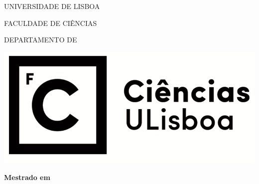 \thispagestyle{empty}


{\coverfont

\begin{center}

{\large 
UNIVERSIDADE DE LISBOA
\vspace{8.0pt}

FACULDADE DE CIÊNCIAS
\vspace{8.0pt}

DEPARTAMENTO DE \departmentname
\vspace{8.0pt}
}

\vspace{46pt}

\includegraphics{images/logotipo.png}

\vspace{117pt}

{\fontsize{17}{19.55}\coverfont\textbf{\thesisname}}

\vspace{110pt}

{\fontsize{15}{17.25}\coverfont\studentname}

\vspace{74pt}

{\fontsize{13}{14.95}\coverfont\textbf{Mestrado em {\coursename}}

\vspace{0.65pt}

}
\end{center}}
